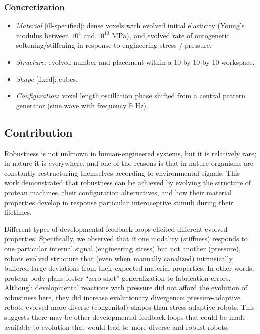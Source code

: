\subsubsection*{Concretization}


\begin{itemize}
    \item \textit{Material} [ill-specified]: dense voxels with evolved initial elasticity (Young's modulus between $10^4$ and $10^{10}$ MPa), and evolved rate of ontogenetic softening/stiffening in response to engineering stress / pressure.
    \item \textit{Structure}: evolved number and placement within a 10-by-10-by-10 workspace.
    \item \textit{Shape} [fixed]: cubes.
    \item \textit{Configuration}: voxel length oscillation phase shifted from a central pattern generator (sine wave with frequency 5 Hz).
\end{itemize}



\subsection{Contribution}


Robustness is not unknown in human-engineered systems, but it is relatively rare; in nature it is everywhere, and one of the reasons is that in nature organisms are constantly restructuring themselves according to environmental signals.
This work demonstrated that robustness can be achieved by evolving the structure of protean machines, their configuration alternatives, and how
their material properties develop in response particular interoceptive stimuli during their lifetimes.

Different types of developmental feedback loops elicited different evolved properties.
Specifically, we observed that if one modality (stiffness) responds to one particular internal signal (engineering stress) but not another (pressure), robots evolved structure that (even when manually canalized) intrinsically buffered large deviations from their expected material properties.
In other words, protean body plans foster ``zero-shot'' generalization to fabrication errors.
Although developmental reactions with pressure did not afford the evolution of robustness here, they did increase evolutionary divergence: 
pressure-adaptive robots evolved more diverse 
(congenital) 
shapes than stress-adaptive robots.
This suggests
there may be other developmental feedback loops that could be made available to evolution
that would lead to more diverse and robust robots.

